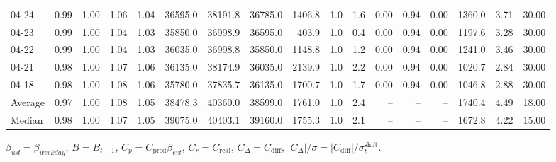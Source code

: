 \begin{threeparttable}
{\begin{tabular}{lrrrrrrrrrrrrrrrr}
  04-24 &         0.99 &           1.00 &          1.06 &          1.04 & 36595.0 & 38191.8 & 36785.0 &     1406.8 &                      1.0 &                 1.6 &       0.00 &      0.94 &           0.00 &           1360.0 &            3.71 &                  30.00 \\
  04-23 &         0.99 &           1.00 &          1.04 &          1.03 & 35850.0 & 36998.9 & 36595.0 &      403.9 &                      1.0 &                 0.4 &       0.00 &      0.94 &           0.00 &           1197.6 &            3.28 &                  30.00 \\
  04-22 &         0.99 &           1.00 &          1.04 &          1.03 & 36035.0 & 36998.8 & 35850.0 &     1148.8 &                      1.0 &                 1.2 &       0.00 &      0.94 &           0.00 &           1241.0 &            3.46 &                  30.00 \\
  04-21 &         0.98 &           1.00 &          1.07 &          1.06 & 36135.0 & 38174.9 & 36035.0 &     2139.9 &                      1.0 &                 2.2 &       0.00 &      0.94 &           0.00 &           1020.7 &            2.84 &                  30.00 \\
  04-18 &         0.98 &           1.00 &          1.08 &          1.06 & 35780.0 & 37835.7 & 36135.0 &     1700.7 &                      1.0 &                 1.7 &       0.00 &      0.94 &           0.00 &           1046.8 &            2.88 &                  30.00 \\
Average &         0.97 &           1.00 &          1.08 &          1.05 & 38478.3 & 40360.0 & 38599.0 &     1761.0 &                      1.0 &                 2.4 &         -- &        -- &             -- &           1740.4 &            4.49 &                  18.00 \\
 Median &         0.98 &           1.00 &          1.07 &          1.05 & 39075.0 & 40403.1 & 39160.0 &     1755.3 &                      1.0 &                 2.1 &         -- &        -- &             -- &           1672.8 &            4.22 &                  15.00 \\
\bottomrule
\end{tabular}
}
\begin{tablenotes}\footnotesize
\item $\beta_{wd}=\beta_{weekday}$, $B=B_{t-1}$,
$C_p=C_{\text{pred}}\beta_{evt}$, $C_r=C_{\text{real}}$,
$C_\Delta=C_{\text{diff}}$, $|C_\Delta|/\sigma=|C_{\text{diff}}|/\sigma_t^{\text{shift}}$.
\end{tablenotes}
\end{threeparttable}
\endgroup
